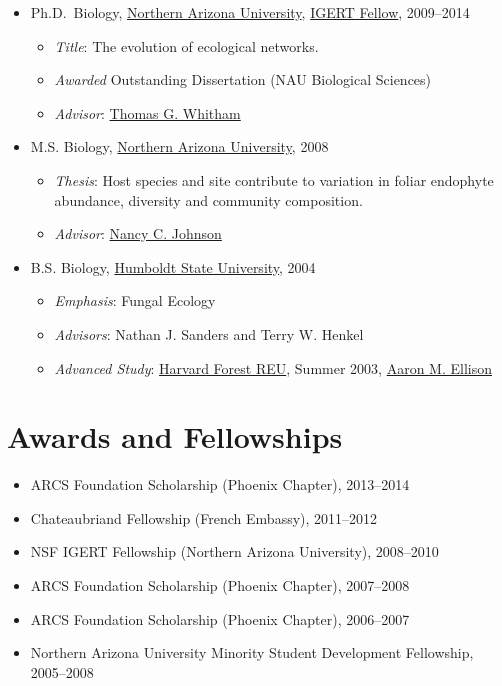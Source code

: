 \documentclass[a4paper]{article}
\begin{document}
\begin{itemize}
\item
  Ph.D.~Biology, \href{http://www.nau.edu}{Northern Arizona University},
  \href{http://www.mpcer.nau.edu/igert/}{IGERT Fellow}, 2009--2014

  \begin{itemize}
  \item
    \emph{Title}: The evolution of ecological networks.
  \item
    \emph{Awarded} Outstanding Dissertation (NAU Biological Sciences)
  \item
    \emph{Advisor}:
    \href{http://www6.nau.edu/biology/People/Faculty/Whitham/Whitham.htm}{Thomas
    G. Whitham}
  \end{itemize}
\item
  M.S. Biology, \href{http://www.nau.edu}{Northern Arizona University},
  2008
  \begin{itemize}
  \item
    \emph{Thesis}: Host species and site contribute to variation in
    foliar endophyte abundance, diversity and community composition.
  \item
    \emph{Advisor}:
    \href{http://www.nau.edu/~envsci/johnsonlab/index.htm}{Nancy C.
    Johnson}
  \end{itemize}
\item
  B.S. Biology, \href{http://www.humboldt.edu/~biosci/}{Humboldt State
  University}, 2004

  \begin{itemize}
  \item
    \emph{Emphasis}: Fungal Ecology
  \item
    \emph{Advisors}: Nathan J. Sanders and Terry W. Henkel
  \item
    \emph{Advanced Study}:
    \href{http://harvardforest.fas.harvard.edu/education/reu/reu.html}{Harvard
      Forest REU}, Summer 2003,
    \href{http://harvardforest.fas.harvard.edu/profiles/ellison.html}{Aaron
      M. Ellison}
  \end{itemize}
\end{itemize}

\section{Awards and Fellowships}\label{awards-and-fellowships}

\begin{itemize}
\item
  ARCS Foundation Scholarship (Phoenix Chapter), 2013--2014
\item
  Chateaubriand Fellowship (French Embassy), 2011--2012
\item
  NSF IGERT Fellowship (Northern Arizona University), 2008--2010
\item
  ARCS Foundation Scholarship (Phoenix Chapter), 2007--2008
\item
  ARCS Foundation Scholarship (Phoenix Chapter), 2006--2007
\item
  Northern Arizona University Minority Student Development Fellowship,
  2005--2008
\end{itemize}
\end{document}
